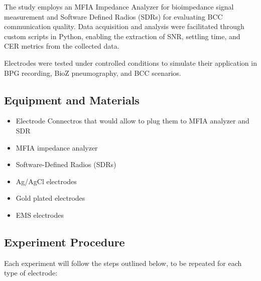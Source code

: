 \documentclass[conference]{IEEEtran}
\begin{document}
The study employs an MFIA Impedance Analyzer for bioimpedance signal measurement and Software Defined Radios (SDRs) for evaluating BCC communication quality. Data acquisition and analysis were facilitated through custom scripts in Python, enabling the extraction of SNR, settling time, and CER metrics from the collected data.

Electrodes were tested under controlled conditions to simulate their application in BPG recording, BioZ pneumography, and BCC scenarios.

\subsection{Equipment and Materials}
\begin{itemize}
    \item Electrode Connectros that would allow to plug them to MFIA analyzer and SDR
    \item MFIA impedance analyzer
    \item Software-Defined Radios (SDRs)
    \item Ag/AgCl electrodes
    \item Gold plated electrodes
    \item EMS electrodes
\end{itemize}

\subsection{Experiment Procedure}
Each experiment will follow the steps outlined below, to be repeated for each type of electrode:
\end{document}
